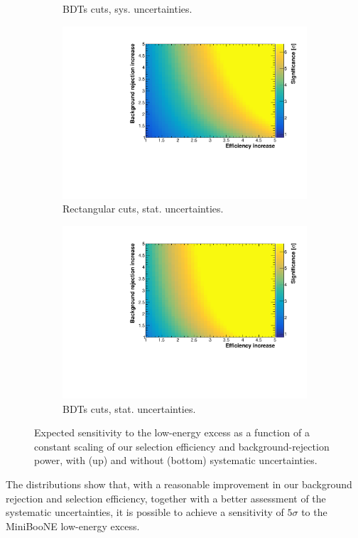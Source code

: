 \begin{figure}[htbp]
\begin{center}
\begin{subfigure}{0.48\textwidth}
      \caption{BDTs cuts, sys. uncertainties.} 
    \end{subfigure}
     \begin{subfigure}{0.48\textwidth}
      \includegraphics[width=\linewidth]{figures/cuts_2d_stat.pdf}
      \caption{Rectangular cuts, stat. uncertainties.}  
    \end{subfigure}\hfill
    \begin{subfigure}{0.48\textwidth}
      \includegraphics[width=\linewidth]{figures/bdt_2d_stat.pdf}
      \caption{BDTs cuts, stat. uncertainties.} 
    \end{subfigure}
    \caption{Expected sensitivity to the low-energy excess as a function of a constant scaling of our selection efficiency and background-rejection power, with (up) and without (bottom) systematic uncertainties.}\label{fig:improvements}
	\end{center}
\end{figure}

The distributions show that, with a reasonable improvement in our background rejection and selection efficiency, together with a better assessment of the systematic uncertainties, it is possible to achieve a sensitivity of $5\sigma$ to the MiniBooNE low-energy excess.

